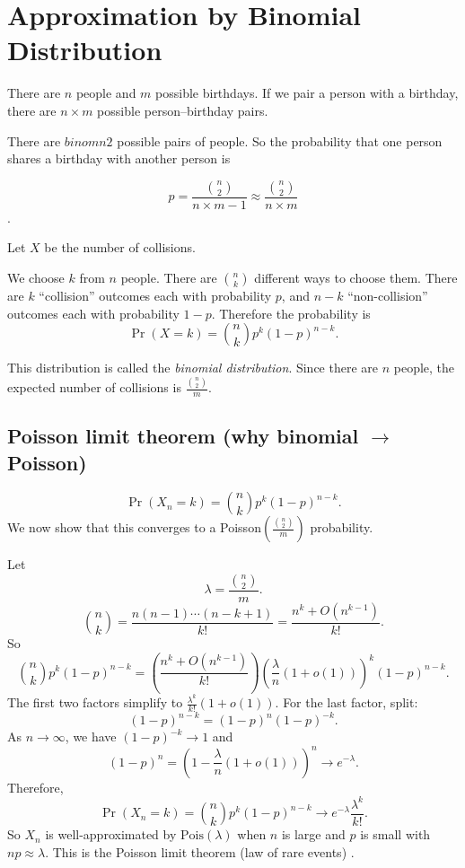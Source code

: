 \section{Approximation by Binomial Distribution}
There are \(n\) people and \(m\) possible birthdays.
If we pair a person with a birthday, there are \(n\times m\) possible
person--birthday pairs.

There are \(binom{n}{2}\) possible pairs of people.
So the probability that one person shares a birthday with another person is

\[p=\frac{\binom{n}{2}}{n\times m-1}
\approx \frac{\binom{n}{2}}{n\times m}
\].

Let \(X\) be the number of collisions. 

We choose \(k\) from \(n\) people. There are \(\binom{n}{k}\) different ways to
choose them. There are \(k\) ``collision'' outcomes each with probability \(p\),
and \(n-k\) ``non-collision'' outcomes each with probability \(1-p\). Therefore
the probability is
\[
\Pr(X=k)=\binom{n}{k}p^k(1-p)^{n-k}.
\]

This distribution is called the \emph{binomial distribution}.
Since there are \(n\) people, the expected number of collisions is
\(\frac{\binom{n}{2}}{m}\).

\subsection*{Poisson limit theorem (why binomial \(\to\) Poisson)}
\[
\Pr(X_n=k)=\binom{n}{k}p^k(1-p)^{n-k}.
\]
We now show that this converges to a Poisson\(\!\left(\frac{\binom{n}{2}}{m}\right)\)
probability.

Let \[
\lambda=\frac{\binom{n}{2}}{m}.
\]
\[
\binom{n}{k}
=\frac{n(n-1)\cdots(n-k+1)}{k!}
=\frac{n^k+O(n^{k-1})}{k!}.
\]
So
\[
\binom{n}{k}p^k(1-p)^{n-k}
=\left(\frac{n^k+O(n^{k-1})}{k!}\right)
\left(\frac{\lambda}{n}(1+o(1))\right)^k
(1-p)^{n-k}.
\]
The first two factors simplify to \(\frac{\lambda^k}{k!}(1+o(1))\). For the last
factor, split:
\[
(1-p)^{n-k}=(1-p)^n(1-p)^{-k}.
\]
As \(n\to\infty\), we have \((1-p)^{-k}\to 1\) and
\[
(1-p)^n
=\left(1-\frac{\lambda}{n}(1+o(1))\right)^n
\to e^{-\lambda}.
\]
Therefore,
\[
\Pr(X_n=k)=\binom{n}{k}p^k(1-p)^{n-k}\to e^{-\lambda}\frac{\lambda^k}{k!}.
\]
So \(X_n\) is well-approximated by \(\mathrm{Pois}(\lambda)\) when \(n\) is large
and \(p\) is small with \(np\approx \lambda\). This is the Poisson limit
theorem (law of rare events) \cite{wiki:poisson-limit-theorem}.

